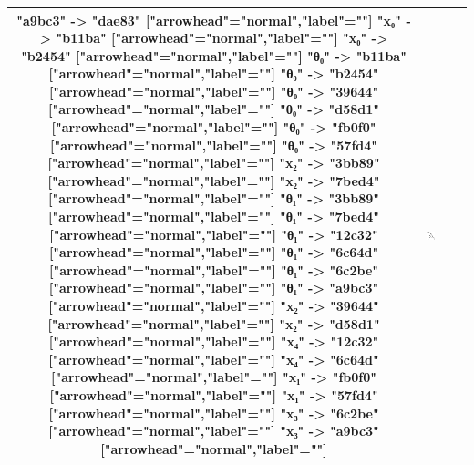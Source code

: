 \documentclass[11pt]{article}
\begin{document}
\begin{table}[H]
\begin{tabular}{|c|c|c|c|}
\begin{adjustbox}{minipage={.22\textwidth}, height=0.14\textwidth, margin*=0cm -0.3cm 0cm 0.1cm}
{    "a9bc3" -> "dae83" ["arrowhead"="normal","label"=""]
    "x₀" -> "b11ba" ["arrowhead"="normal","label"=""]
    "x₀" -> "b2454" ["arrowhead"="normal","label"=""]
    "θ₀" -> "b11ba" ["arrowhead"="normal","label"=""]
    "θ₀" -> "b2454" ["arrowhead"="normal","label"=""]
    "θ₀" -> "39644" ["arrowhead"="normal","label"=""]
    "θ₀" -> "d58d1" ["arrowhead"="normal","label"=""]
    "θ₀" -> "fb0f0" ["arrowhead"="normal","label"=""]
    "θ₀" -> "57fd4" ["arrowhead"="normal","label"=""]
    "x₂" -> "3bb89" ["arrowhead"="normal","label"=""]
    "x₂" -> "7bed4" ["arrowhead"="normal","label"=""]
    "θ₁" -> "3bb89" ["arrowhead"="normal","label"=""]
    "θ₁" -> "7bed4" ["arrowhead"="normal","label"=""]
    "θ₁" -> "12c32" ["arrowhead"="normal","label"=""]
    "θ₁" -> "6c64d" ["arrowhead"="normal","label"=""]
    "θ₁" -> "6c2be" ["arrowhead"="normal","label"=""]
    "θ₁" -> "a9bc3" ["arrowhead"="normal","label"=""]
    "x₂" -> "39644" ["arrowhead"="normal","label"=""]
    "x₂" -> "d58d1" ["arrowhead"="normal","label"=""]
    "x₄" -> "12c32" ["arrowhead"="normal","label"=""]
    "x₄" -> "6c64d" ["arrowhead"="normal","label"=""]
    "x₁" -> "fb0f0" ["arrowhead"="normal","label"=""]
    "x₁" -> "57fd4" ["arrowhead"="normal","label"=""]
    "x₃" -> "6c2be" ["arrowhead"="normal","label"=""]
    "x₃" -> "a9bc3" ["arrowhead"="normal","label"=""]
    } \end{adjustbox} &
            \begin{adjustbox}{minipage={.18\textwidth}, height=0.11\textwidth, margin*=0cm -0.1cm 0cm 0cm}
            \includegraphics[scale=0.15]{../clipart/adj_prog.png}
            \end{adjustbox}
            \\ \hline
        \end{tabular}
    \end{table}
\end{document}
